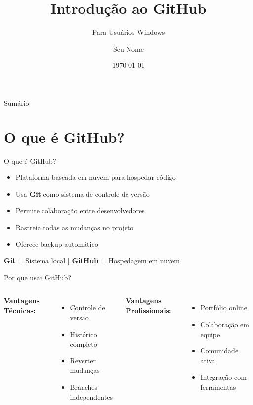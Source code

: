 \documentclass[11pt]{beamer}
\title{Introdução ao GitHub}
\subtitle{Para Usuários Windows}
\author{Seu Nome}
\date{\today}
\institute{Curso de Desenvolvimento}
\begin{document}
\begin{frame}
\titlepage
\end{frame}

\begin{frame}{Sumário}
\tableofcontents
\end{frame}

\section{O que é GitHub?}

\begin{frame}{O que é GitHub?}
\begin{itemize}
    \item Plataforma baseada em nuvem para hospedar código
    \item Usa \textbf{Git} como sistema de controle de versão
    \item Permite colaboração entre desenvolvedores
    \item Rastreia todas as mudanças no projeto
    \item Oferece backup automático
\end{itemize}

\begin{center}
    \large \textbf{Git} = Sistema local | \textbf{GitHub} = Hospedagem em nuvem
\end{center}
\end{frame}

\begin{frame}{Por que usar GitHub?}
\begin{columns}
\textbf{Vantagens Técnicas:}
\begin{itemize}
    \small
    \item Controle de versão
    \item Histórico completo
    \item Reverter mudanças
    \item Branches independentes
\end{itemize}

\textbf{Vantagens Profissionais:}
\begin{itemize}
    \small
    \item Portfólio online
    \item Colaboração em equipe
    \item Comunidade ativa
    \item Integração com ferramentas
\end{itemize}
\end{columns}
\end{frame}
\end{document}
